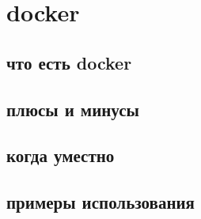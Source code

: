 \section{docker}
\subsection{что есть docker}
\subsection{плюсы и минусы}
\subsection{когда уместно}
\subsection{примеры использования}
\newpage

